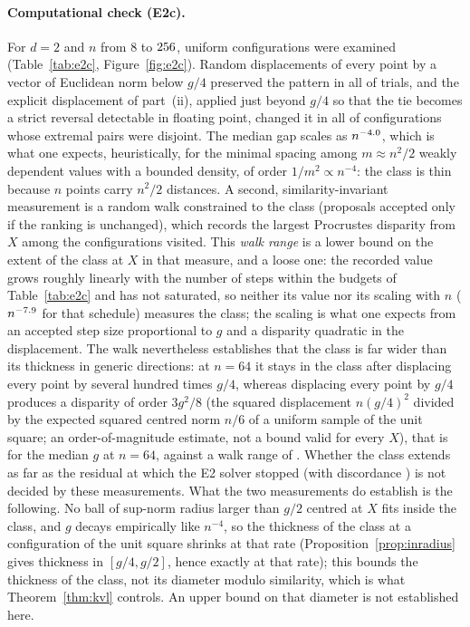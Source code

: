 \documentclass[11pt,a4paper]{article}
\theoremstyle{plain}
\theoremstyle{definition}
\theoremstyle{remark}
\begin{document}
\paragraph{Computational check (E2c).}
For $d=2$ and $n$ from $8$ to $256$, \EtwocConfigsTotal{} uniform configurations were examined (Table~\ref{tab:e2c}, Figure~\ref{fig:e2c}). Random displacements of every point by a vector of Euclidean norm below $g/4$ preserved the pattern in all \EtwocKeptTotal{} of \EtwocPertTotal{} trials, and the explicit displacement of part~(ii), applied just beyond $g/4$ so that the tie becomes a strict reversal detectable in floating point, changed it in all \EtwocChangedTotal{} of \EtwocChangedTested{} configurations whose extremal pairs were disjoint. The median gap scales as $n^{-4.0}$, which is what one expects, heuristically, for the minimal spacing among $m\approx n^2/2$ weakly dependent values with a bounded density, of order $1/m^2\propto n^{-4}$: the class is thin because $n$ points carry $n^2/2$ distances. A second, similarity-invariant measurement is a random walk constrained to the class (proposals accepted only if the ranking is unchanged), which records the largest Procrustes disparity from $X$ among the configurations visited. This \emph{walk range} is a lower bound on the extent of the class at $X$ in that measure, and a loose one: the recorded value grows roughly linearly with the number of steps within the budgets of Table~\ref{tab:e2c} and has not saturated, so neither its value nor its scaling with $n$ ($n^{-7.9}$ for that schedule) measures the class; the scaling is what one expects from an accepted step size proportional to $g$ and a disparity quadratic in the displacement. The walk nevertheless establishes that the class is far wider than its thickness in generic directions: at $n=64$ it stays in the class after displacing every point by several hundred times $g/4$, whereas displacing every point by $g/4$ produces a disparity of order $3g^2/8$ (the squared displacement $n(g/4)^2$ divided by the expected squared centred norm $n/6$ of a uniform sample of the unit square; an order-of-magnitude estimate, not a bound valid for every $X$), that is \EtwocDispEstNsixtyfour{} for the median $g$ at $n=64$, against a walk range of \EtwocWalkNsixtyfour{}. Whether the class extends as far as the residual \EtwoMedDtwoNsixtyfourAgain{} at which the E2 solver stopped (with discordance \EtwoDiscDtwoNsixtyfour) is not decided by these measurements. What the two measurements do establish is the following. No ball of sup-norm radius larger than $g/2$ centred at $X$ fits inside the class, and $g$ decays empirically like $n^{-4}$, so the thickness of the class at a configuration of the unit square shrinks at that rate (Proposition~\ref{prop:inradius} gives thickness in $[g/4,g/2]$, hence exactly at that rate); this bounds the thickness of the class, not its diameter modulo similarity, which is what Theorem~\ref{thm:kvl} controls. An upper bound on that diameter is not established here.
\end{document}
